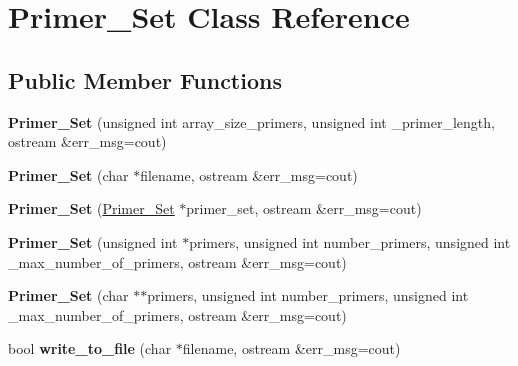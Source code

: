 \hypertarget{class_primer___set}{}\section{Primer\+\_\+\+Set Class Reference}
\label{class_primer___set}
\subsection*{Public Member Functions}
\begin{DoxyCompactItemize}
\item 
\mbox{\label{class_primer___set_ab9db4a9ad37106aac40762b7b4d57d4f}} 
{\bfseries Primer\+\_\+\+Set} (unsigned int array\+\_\+size\+\_\+primers, unsigned int \+\_\+primer\+\_\+length, ostream \&err\+\_\+msg=cout)
\item 
\mbox{\label{class_primer___set_ae81dafc2ac39deb5480f68dac440e88e}} 
{\bfseries Primer\+\_\+\+Set} (char $\ast$filename, ostream \&err\+\_\+msg=cout)
\item 
\mbox{\label{class_primer___set_a47c64ebda73f5a9d34d68f3c116c09cf}} 
{\bfseries Primer\+\_\+\+Set} (\mbox{\hyperlink{class_primer___set}{Primer\+\_\+\+Set}} $\ast$primer\+\_\+set, ostream \&err\+\_\+msg=cout)
\item 
\mbox{\label{class_primer___set_ae3c919cd6aa18e8e2c3e4f5d3ea9a37c}} 
{\bfseries Primer\+\_\+\+Set} (unsigned int $\ast$primers, unsigned int number\+\_\+primers, unsigned int \+\_\+max\+\_\+number\+\_\+of\+\_\+primers, ostream \&err\+\_\+msg=cout)
\item 
\mbox{\label{class_primer___set_aa6e3ae72bc7cd4506b48b09e6591bd0f}} 
{\bfseries Primer\+\_\+\+Set} (char $\ast$$\ast$primers, unsigned int number\+\_\+primers, unsigned int \+\_\+max\+\_\+number\+\_\+of\+\_\+primers, ostream \&err\+\_\+msg=cout)
\item 
\mbox{\label{class_primer___set_a55d08f895a8af207b7e06abf8bf95f99}} 
bool {\bfseries write\+\_\+to\+\_\+file} (char $\ast$filename, ostream \&err\+\_\+msg=cout)
\item 
\mbox{\label{class_primer___set_a86da618d3bafd760ceb21099b168e54c}} 
$$
\end{DoxyCompactItemize}
